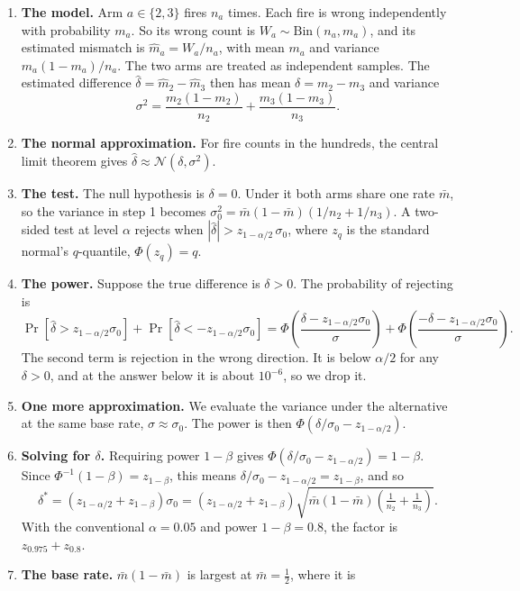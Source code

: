 \documentclass[11pt]{article}
\begin{document}
\begin{enumerate}
  \item \textbf{The model.} Arm $a\in\{2,3\}$ fires $n_a$ times. Each fire is wrong
  independently with probability $m_a$. So its wrong count is $W_a\sim\mathrm{Bin}(n_a,m_a)$,
  and its estimated mismatch is $\hat m_a=W_a/n_a$, with mean $m_a$ and variance
  $m_a(1-m_a)/n_a$. The two arms are treated as independent samples. The estimated difference
  $\hat\delta=\hat m_2-\hat m_3$ then has mean $\delta=m_2-m_3$ and variance
  \[
    \sigma^2=\frac{m_2(1-m_2)}{n_2}+\frac{m_3(1-m_3)}{n_3}.
  \]
  \item \textbf{The normal approximation.} For fire counts in the hundreds, the central limit
  theorem gives $\hat\delta\approx\mathcal N(\delta,\sigma^2)$.
  \item \textbf{The test.} The null hypothesis is $\delta=0$. Under it both arms share one rate
  $\bar m$, so the variance in step 1 becomes $\sigma_0^2=\bar m(1-\bar m)(1/n_2+1/n_3)$. A
  two-sided test at level $\alpha$ rejects when $|\hat\delta|>z_{1-\alpha/2}\,\sigma_0$, where
  $z_q$ is the standard normal's $q$-quantile, $\Phi(z_q)=q$.
  \item \textbf{The power.} Suppose the true difference is $\delta>0$. The probability of
  rejecting is
  \[
    \Pr\!\left[\hat\delta>z_{1-\alpha/2}\sigma_0\right]+\Pr\!\left[\hat\delta<-z_{1-\alpha/2}\sigma_0\right]
    =\Phi\!\left(\frac{\delta-z_{1-\alpha/2}\sigma_0}{\sigma}\right)
    +\Phi\!\left(\frac{-\delta-z_{1-\alpha/2}\sigma_0}{\sigma}\right).
  \]
  The second term is rejection in the wrong direction. It is below $\alpha/2$ for any
  $\delta>0$, and at the answer below it is about $10^{-6}$, so we drop it.
  \item \textbf{One more approximation.} We evaluate the variance under the alternative at the
  same base rate, $\sigma\approx\sigma_0$. The power is then
  $\Phi\!\left(\delta/\sigma_0-z_{1-\alpha/2}\right)$.
  \item \textbf{Solving for $\delta$.} Requiring power $1-\beta$ gives
  $\Phi(\delta/\sigma_0-z_{1-\alpha/2})=1-\beta$. Since $\Phi^{-1}(1-\beta)=z_{1-\beta}$, this
  means $\delta/\sigma_0-z_{1-\alpha/2}=z_{1-\beta}$, and so
  \[
    \delta^\ast=\left(z_{1-\alpha/2}+z_{1-\beta}\right)\sigma_0
    =\left(z_{1-\alpha/2}+z_{1-\beta}\right)\sqrt{\bar m(1-\bar m)\left(\tfrac{1}{n_2}+\tfrac{1}{n_3}\right)}.
  \]
  With the conventional $\alpha=0.05$ and power $1-\beta=0.8$, the factor is
  $z_{0.975}+z_{0.8}$.
  \item \textbf{The base rate.} $\bar m(1-\bar m)$ is largest at $\bar m=\tfrac12$, where it is

\end{enumerate}
\end{document}
